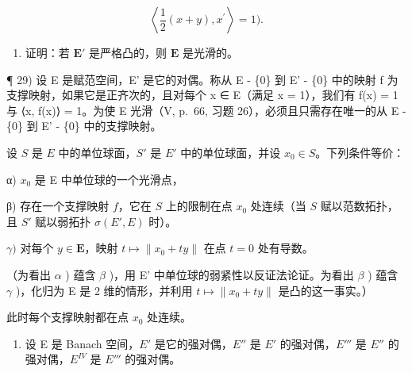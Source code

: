 \[
\left\langle \frac {1}{2} (x + y), x ^ {\prime} \right\rangle = 1).
\]

\begin{enumerate}
\def\labelenumi{\alph{enumi})}
\setcounter{enumi}{1}
\tightlist
\item
  证明：若 \(\mathbf{E}'\) 是严格凸的，则 \(\mathbf{E}\) 是光滑的。
\end{enumerate}

¶ 29) 设 E 是赋范空间，E' 是它的对偶。称从 E - \{0\} 到 E' - \{0\} 中的映射 f 为支撑映射，如果它是正齐次的，且对每个 x ∈ E（满足 \textbar\textbar x\textbar\textbar{} = 1），我们有 \textbar\textbar f(x)\textbar\textbar{} = 1 与 ⟨x, f(x)⟩ = 1。为使 E 光滑（V, p.~66, 习题 26），必须且只需存在唯一的从 E - \{0\} 到 E' - \{0\} 中的支撑映射。

设 \(S\) 是 \(E\) 中的单位球面，\(S'\) 是 \(E'\) 中的单位球面，并设 \(x_0 \in S\)。下列条件等价：

α) \(x_{0}\) 是 E 中单位球的一个光滑点，

β) 存在一个支撑映射 \(f\)，它在 \(S\) 上的限制在点 \(x_0\) 处连续（当 \(S\) 赋以范数拓扑，且 \(S'\) 赋以弱拓扑 \(\sigma(E', E)\) 时）。

\(\gamma)\) 对每个 \(y \in \mathbf{E}\)，映射 \(t \mapsto \| x_0 + ty\|\) 在点 \(t = 0\) 处有导数。

（为看出 \(\alpha\) ) 蕴含 \(\beta\) )，用 E' 中单位球的弱紧性以反证法论证。为看出 \(\beta\) ) 蕴含 \(\gamma\) )，化归为 E 是 2 维的情形，并利用 \(t \mapsto \|x_0 + ty\|\) 是凸的这一事实。）

此时每个支撑映射都在点 \(x_0\) 处连续。

\begin{enumerate}
\def\labelenumi{\arabic{enumi})}
\setcounter{enumi}{29}
\tightlist
\item
  设 E 是 Banach 空间，\(E'\) 是它的强对偶，\(E''\) 是 \(E'\) 的强对偶，\(E'''\) 是 \(E''\) 的强对偶，\(E^{IV}\) 是 \(E'''\) 的强对偶。
\end{enumerate}

